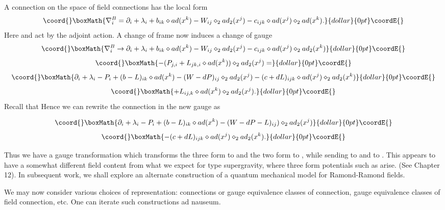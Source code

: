 \documentclass[a4paper,11pt]{amsart}
\begin{document}
A connection on the space of \coordHE{} field connections has the local form 
$$\coord{}\boxMath{\nabla_i^B = \partial_i + \lambda_i + b_{ik}\diamond ad(x^k)
 - W_{ij}\diamond_2ad_2(x^j) - c_{ijk}\diamond
ad(x^j)\diamond_2 ad(x^k).}{dollar}{0pt}\coordE{}$$
Here \coordHE{} and \coordHE{} act by the adjoint action. 
A change of frame \coordHE{} now induces 
a change of gauge 
$$\coord{}\boxMath{\nabla_i^B\rightarrow \partial_i + \lambda_i + b_{ik}\diamond ad(x^k)
- W_{ij}\diamond_2ad_2(x^j) - c_{ijk}\diamond
ad(x^j)\diamond_2 ad_2(x^k)}{dollar}{0pt}\coordE{}$$  $$\coord{}\boxMath{ - (P_{j,i} + L_{jk,i}\diamond ad(x^k))\diamond_2ad_2(x^j) = }{dollar}{0pt}\coordE{}$$  $$\coord{}\boxMath{\partial_i + \lambda_i - P_i + (b-L)_{ik}\diamond ad(x^k) 
- (W-dP)_{ij}\diamond_2ad_2(x^j) - (c+dL)_{ijk}\diamond
ad(x^j)\diamond_2 ad_2(x^k)}{dollar}{0pt}\coordE{}$$  $$\coord{}\boxMath{ + L_{ij,k}\diamond ad(x^k)\diamond_2ad_2(x^j). }{dollar}{0pt}\coordE{}$$
Recall that 
\coordHE{} Hence we can rewrite the connection in
the new gauge as 

$$\coord{}\boxMath{\partial_i + \lambda_i - P_i + (b-L)_{ik}\diamond ad(x^k) 
- (W - dP-L)_{ij})\diamond_2ad_2(x^j)}{dollar}{0pt}\coordE{}$$  $$\coord{}\boxMath{ - (c+dL)_{ijk}\diamond ad(x^j)\diamond_2 ad_2(x^k). }{dollar}{0pt}\coordE{}$$

Thus we have a gauge transformation which transforms the three form \coordHE{} 
to \coordHE{} and the two form \coordHE{} to \coordHE{}, while sending 
\coordHE{} to \coordHE{} and \coordHE{} to \coordHE{}.  This appears
to have a somewhat different field content from what we expect for type \coordHE{}
supergravity, where three form potentials such as \coordHE{} arise. 
(See \cite{P2}{Chapter 12}). In subsequent work, we shall explore an alternate construction of a
quantum mechanical model for Ramond-Ramond fields. 

We may now consider various choices of representation: 
connections or gauge equivalence classes of connection, gauge equivalence
classes of \coordHE{} field connection, etc.  One can iterate such constructions ad
nauseum.
\end{document}
